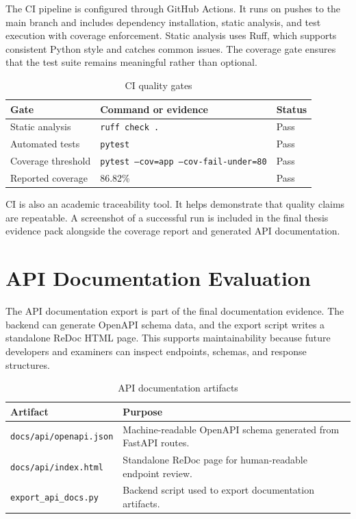 The CI pipeline is configured through GitHub Actions. It runs on pushes to the main branch and includes dependency installation, static analysis, and test execution with coverage enforcement. Static analysis uses Ruff, which supports consistent Python style and catches common issues. The coverage gate ensures that the test suite remains meaningful rather than optional.

\begin{table}[H]
\centering
\caption{CI quality gates}
\label{tab:ci-gates}
\begin{tabular}{|p{}|p{}|p{}|}
\hline
\textbf{Gate} & \textbf{Command or evidence} & \textbf{Status}\\
\hline
Static analysis & \texttt{ruff check .} & Pass\\
\hline
Automated tests & \texttt{pytest} & Pass\\
\hline
Coverage threshold & \texttt{pytest --cov=app --cov-fail-under=80} & Pass\\
\hline
Reported coverage & 86.82\% & Pass\\
\hline
\end{tabular}
\end{table}

CI is also an academic traceability tool. It helps demonstrate that quality claims are repeatable. A screenshot of a successful run is included in the final thesis evidence pack alongside the coverage report and generated API documentation.

\section{API Documentation Evaluation}

The API documentation export is part of the final documentation evidence. The backend can generate OpenAPI schema data, and the export script writes a standalone ReDoc HTML page. This supports maintainability because future developers and examiners can inspect endpoints, schemas, and response structures.

\begin{table}[H]
\centering
\caption{API documentation artifacts}
\label{tab:api-docs}
\begin{tabular}{|p{}|p{}|}
\hline
\textbf{Artifact} & \textbf{Purpose}\\
\hline
\texttt{docs/api/openapi.json} & Machine-readable OpenAPI schema generated from FastAPI routes.\\
\hline
\texttt{docs/api/index.html} & Standalone ReDoc page for human-readable endpoint review.\\
\hline
\texttt{export\_api\_docs.py} & Backend script used to export documentation artifacts.\\
\hline
\end{tabular}
\end{table}

